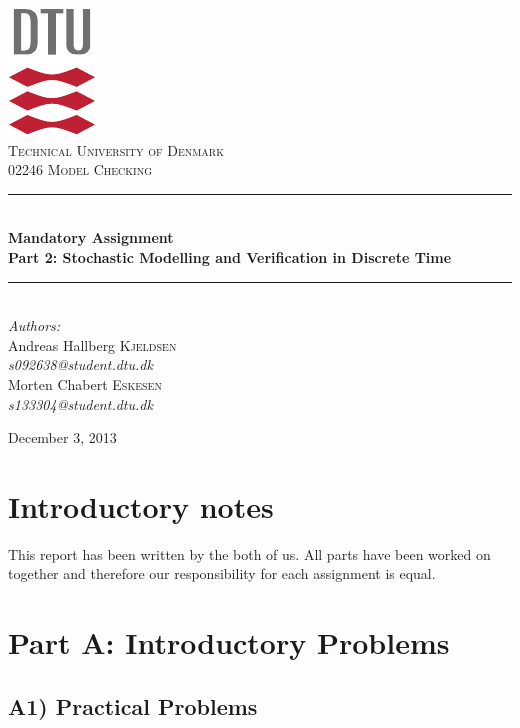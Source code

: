 \documentclass[12pt]{report}
\newcommand{\HRule}{\rule{\linewidth}{0.5mm}}
\begin{document}
\begin{titlepage}
\begin{center}

\includegraphics[scale=2.0]{../GFX/dtu_logo.pdf}\\[1cm]

\textsc{\LARGE Technical University of Denmark}\\[1.5cm]

\textsc{\Large 02246 Model Checking}\\[0.5cm]


\HRule \\[0.4cm]
{\huge \bfseries Mandatory Assignment\\Part 2: Stochastic Modelling and Verification in Discrete Time}\\[0.1cm]
\HRule \\[1.5cm]

\large
\emph{Authors:}
\\[10pt]
Andreas Hallberg \textsc{Kjeldsen}\\
\emph{s092638@student.dtu.dk}
\\[10pt]
Morten Chabert \textsc{Eskesen}\\
\emph{s133304@student.dtu.dk}

\vfill

{\large December 3, 2013}

\end{center}
\end{titlepage}

\chapter*{Introductory notes}
This report has been written by the both of us. All parts have been worked on together and therefore our responsibility for each assignment is equal.
\chapter*{Part A: Introductory Problems}
\section*{A1) Practical Problems}
\end{document}
